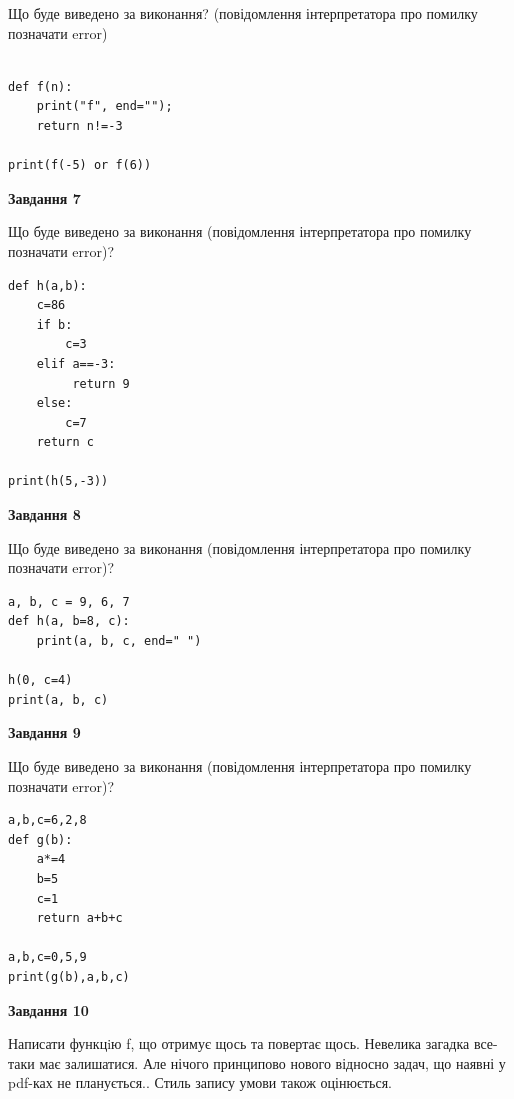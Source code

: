 \documentclass[12pt, ukrainian]{article}
\begin{document}
{\begin {large}
Що буде виведено за виконання? (повідомлення інтерпретатора про помилку позначати error)\par
\begin{verbatim}

def f(n):
    print("f", end="");
    return n!=-3

print(f(-5) or f(6))
\end{verbatim}

{\begin {center}\textbf{Завдання 7}\end {center}}

Що буде виведено за виконання (повідомлення інтерпретатора про помилку позначати error)?\par
\begin{verbatim}
def h(a,b):
    c=86
    if b:
        c=3
    elif a==-3:
         return 9
    else: 
        c=7
    return c

print(h(5,-3))
\end{verbatim}

{\begin {center}\textbf{Завдання 8}\end {center}}

Що буде виведено за виконання (повідомлення інтерпретатора про помилку позначати error)?\par
\begin{verbatim}
a, b, c = 9, 6, 7
def h(a, b=8, c):
    print(a, b, c, end=" ")

h(0, c=4)
print(a, b, c)
\end{verbatim}

{\begin {center}\textbf{Завдання 9}\end {center}}

Що буде виведено за виконання (повідомлення інтерпретатора про помилку позначати error)?\par
\begin{verbatim}
a,b,c=6,2,8
def g(b):
    a*=4
    b=5
    c=1
    return a+b+c

a,b,c=0,5,9
print(g(b),a,b,c)
\end{verbatim}

{\begin {center}\textbf{Завдання 10}\end {center}}


Написати функцiю f, що отримує щось та повертає щось. Невелика загадка все-таки має залишатися. Але нічого принципово нового відносно задач, що наявні у pdf-ках не планується.. Стиль запису умови також оцінюється.\par
\end {large}}
\newpage
\end{document}
